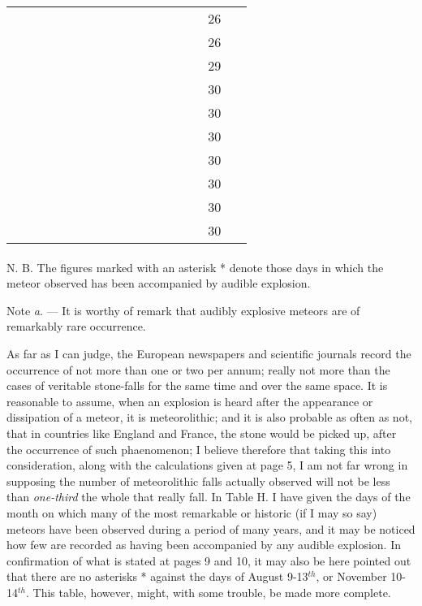\documentclass[a4paper, 12pt, oneside]{article}
\begin{document}
\begin{table}[H]
\begin{tabular}{|l|l|l|l|l|l|l|l|l|l|l|l|}
        ~ & ~ & ~ & ~ & ~ & ~ & ~ & ~ & ~ & ~ & 26 & ~ \\
        ~ & ~ & ~ & ~ & ~ & ~ & ~ & ~ & ~ & ~ & 26 & ~ \\
        ~ & ~ & ~ & ~ & ~ & ~ & ~ & ~ & ~ & ~ & 29 & ~ \\
        ~ & ~ & ~ & ~ & ~ & ~ & ~ & ~ & ~ & ~ & 30 & ~ \\
        ~ & ~ & ~ & ~ & ~ & ~ & ~ & ~ & ~ & ~ & 30 & ~ \\
        ~ & ~ & ~ & ~ & ~ & ~ & ~ & ~ & ~ & ~ & 30 & ~ \\
        ~ & ~ & ~ & ~ & ~ & ~ & ~ & ~ & ~ & ~ & 30 & ~ \\
        ~ & ~ & ~ & ~ & ~ & ~ & ~ & ~ & ~ & ~ & 30 & ~ \\
        ~ & ~ & ~ & ~ & ~ & ~ & ~ & ~ & ~ & ~ & 30 & ~ \\
        ~ & ~ & ~ & ~ & ~ & ~ & ~ & ~ & ~ & ~ & 30 & ~ \\ \hline
    \end{tabular}
\end{table}
\paragraph{}
N. B. The figures marked with an asterisk * denote those days in which the meteor observed has been accompanied by audible explosion.

Note \emph{a}. --- It is worthy of remark that audibly explosive meteors are of remarkably rare occurrence.

As far as I can judge, the European newspapers and scientific journals record the occurrence of not more than one or two per annum; really not more than the cases of veritable stone-falls for the same time and over the same space. It is reasonable to assume, when an explosion is heard after the appearance or dissipation of a meteor, it is meteorolithic; and it is also probable as often as not, that in countries like England and France, the stone would be picked up, after the occurrence of such phaenomenon; I believe therefore that taking this into consideration, along with the calculations given at page 5, I am not far wrong in supposing the number of meteorolithic falls actually observed will not be less than \emph{one-third} the whole that really fall. In Table H. I have given the days of the month on which many of the most remarkable or historic (if I may so say) meteors have been observed during a period of many years, and it may be noticed how few are recorded as having been accompanied by any audible explosion. In confirmation of what is stated at pages 9 and 10, it may also be here pointed out that there are no asterisks * against the days of August 9-13$^{th}$, or November 10-14$^{th}$. This table, however, might, with some trouble, be made more complete.
\clearpage
\end{document}
